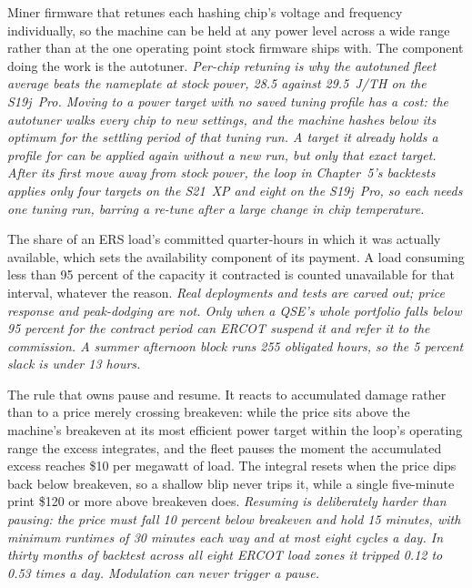 \begin{description}[leftmargin=0pt,style=unboxed,itemsep=0.35em,parsep=0.15em]
\item[autotuning firmware] \hypertarget{glossary:autotuning-firmware}{}Miner firmware that retunes each hashing chip's voltage and frequency individually, so the machine can be held at any power level across a wide range rather than at the one operating point stock firmware ships with. The component doing the work is the autotuner. \emph{Per-chip retuning is why the autotuned fleet average beats the nameplate at stock power, 28.5 against 29.5~J/TH on the S19j~Pro. Moving to a power target with no saved tuning profile has a cost: the autotuner walks every chip to new settings, and the machine hashes below its optimum for the settling period of that tuning run. A target it already holds a profile for can be applied again without a new run, but only that exact target. After its first move away from stock power, the loop in Chapter~5's backtests applies only four targets on the S21~XP and eight on the S19j~Pro, so each needs one tuning run, barring a re-tune after a large change in chip temperature.}
\item[availability factor] \hypertarget{glossary:availability-factor}{}The share of an ERS load's committed quarter-hours in which it was actually available, which sets the availability component of its payment. A load consuming less than 95 percent of the capacity it contracted is counted unavailable for that interval, whatever the reason. \emph{Real deployments and tests are carved out; price response and peak-dodging are not. Only when a QSE's whole portfolio falls below 95 percent for the contract period can ERCOT suspend it and refer it to the commission. A summer afternoon block runs 255 obligated hours, so the 5 percent slack is under 13 hours.}
\item[backstop] \hypertarget{glossary:backstop}{}The rule that owns pause and resume. It reacts to accumulated damage rather than to a price merely crossing breakeven: while the price sits above the machine's breakeven at its most efficient power target within the loop's operating range the excess integrates, and the fleet pauses the moment the accumulated excess reaches \$10 per megawatt of load. The integral resets when the price dips back below breakeven, so a shallow blip never trips it, while a single five-minute print \$120 or more above breakeven does. \emph{Resuming is deliberately harder than pausing: the price must fall 10 percent below breakeven and hold 15 minutes, with minimum runtimes of 30 minutes each way and at most eight cycles a day. In thirty months of backtest across all eight ERCOT load zones it tripped 0.12 to 0.53 times a day. Modulation can never trigger a pause.}

\end{description}

